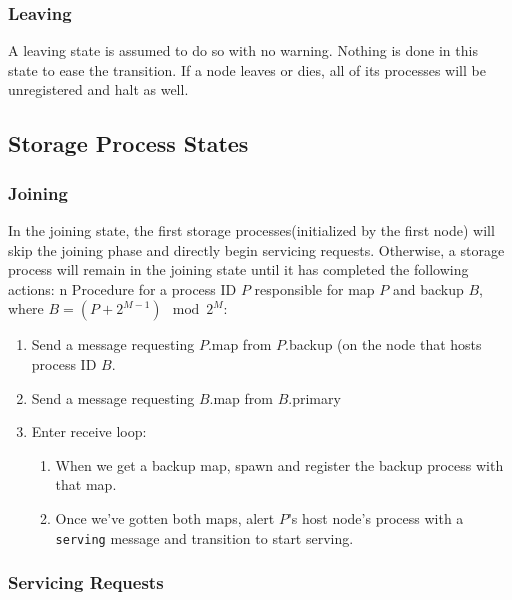 \documentclass[a4paper]{article}
\begin{document}
\subsubsection{Leaving}
A leaving state is assumed to do so with no warning. Nothing is done in this state to ease the transition. If a node leaves or dies, all of its processes will be unregistered and halt as well.


\subsection{Storage Process States}

\subsubsection{Joining} 

In the joining state, the first storage processes(initialized by the first node) will skip the joining phase and directly begin servicing requests. Otherwise, a storage process will remain in the joining state until it has completed the following actions:
n   
Procedure for a process ID $P$ responsible for map $P$ and backup $B$, where $B = (P + 2^{M-1}) \mod 2^{M}$:
\begin{enumerate}
\item Send a message requesting $P$.map from $P$.backup (on the node that hosts process ID $B$.
\item Send a message requesting $B$.map from $B$.primary
\item Enter receive loop:
\begin{enumerate}
\item When we get a backup map, spawn and register the backup process with that map.
\item Once we've gotten both maps, alert $P$'s host node's process with a {\tt serving} message and transition to start serving.
\end{enumerate}
\end{enumerate}


\subsubsection{Servicing Requests}
\end{document}
